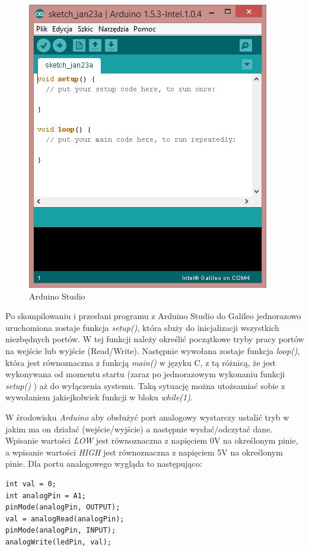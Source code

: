\documentclass{xmgr}
\begin{document}
\begin{figure}[!h]
    \centering
    	\includegraphics[height=0.3\textheight]{images/AS.png}
    \caption{Arduino Studio}
\end{figure}

Po skompilowaniu i przesłani programu z Arduino Studio do Galileo jednorazowo uruchomiona zostaje funkcja \emph{setup()}, która służy do inicjalizacji wszystkich niezbędnych portów. W tej funkcji należy określić początkowe tryby pracy portów na wejście lub wyjście (Read/Write). Następnie wywołana zostaje funkcja \emph{loop()}, która jest równoznaczna z funkcją \emph{main()} w języku C, z tą różnicą, że jest wykonywana od momentu startu (zaraz po jednorazowym wykonaniu funkcji \emph{setup()} ) aż do wyłączenia systemu. Taką sytuację można utożsamiać sobie z wywołaniem jakiejkolwiek funkcji w bloku \emph{while(1)}.

W środowisku \emph{Arduino} aby obsłużyć port analogowy wystarczy ustalić tryb w jakim ma on działać (wejście/wyjście) a następnie wysłać/odczytać dane.  Wpisanie wartości \emph{LOW} jest równoznaczna z napięciem 0V na określonym pinie, a wpisanie wartości \emph{HIGH} jest równoznaczna z napięciem 5V na określonym pinie. Dla portu analogowego wygląda to następująco:

\begin{lstlisting}[label=bot-dirs-alg,caption=Obsługa portu analogowego w środowisku Arduino]
int val = 0;
int analogPin = A1;	
pinMode(analogPin, OUTPUT);
val = analogRead(analogPin);
pinMode(analogPin, INPUT);
analogWrite(ledPin, val);
\end{lstlisting}
\end{document}
